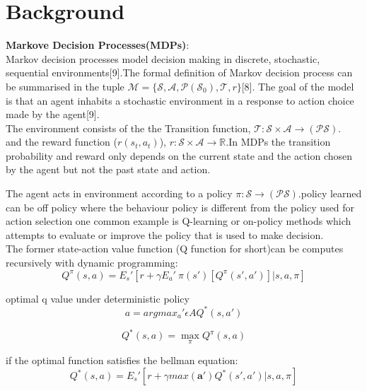\chapter{Background}

\textbf{Markove Decision Processes(MDPs)}:\\

Markov decision processes  model decision making in discrete, stochastic, sequential environments[9].The formal definition of Markov decision process can be summarised in  the tuple $\mathcal{M} = \{\mathcal{S}, \mathcal{A},\mathcal{P(S_0)}, \mathcal{T}, r\}$[8].
The goal of the model is that an agent inhabits a  stochastic environment in a response to action choice made by the agent[9]. \\

The environment consists of the the Transition function, $\mathcal{T} : \mathcal{S} \times \mathcal{A} \to \mathcal{(PS)}$.\\  and the reward function ($r(s_t, a_t)$), $r : \mathcal{S} \times \mathcal{A} \to \mathbb{R}$.In MDPs the transition probability and reward only depends on the current state and the action chosen by the agent  but not the past state and action.

The agent acts in environment according to a policy $\mathcal{\pi} : \mathcal{S} \to \mathcal{(PS)}$.policy learned can be off policy where the behaviour policy is different from the policy used for action selection one common example is Q-learning or on-policy methods which attempts to evaluate or improve the policy that is used to make decision.\\
The former state-action value function (Q function for short)can be computes recursively with dynamic programming: 
\begin{equation}
   	Q^\pi (s,a) = E_s'[r + \gamma E_a'~\pi(s') [Q^\pi(s',a')]|s,a,\pi]
   	
   	\end{equation}
 
optimal q value under deterministic policy
\begin{equation} a = argmax_a'\epsilon A Q^*(s,a')
\end{equation} 

\begin{equation}
	  Q^* (s,a) = \max_\pi  Q^\pi(s,a)
		
\end{equation}

if the optimal function satisfies the bellman equation:
\begin{equation}
    Q^* (s,a) = E_s' [r + \gamma max(\bm{a'}) Q^* (s',a')| s,a,\pi]
\end{equation}


